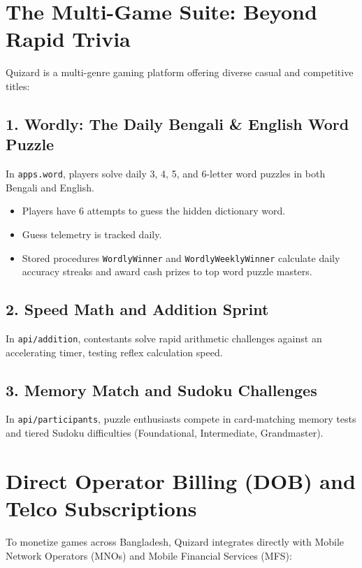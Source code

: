 \section{The Multi-Game Suite: Beyond Rapid Trivia}
Quizard is a multi-genre gaming platform offering diverse casual and competitive titles:

\subsection{1. Wordly: The Daily Bengali \& English Word Puzzle}
In \texttt{apps.word}, players solve daily 3, 4, 5, and 6-letter word puzzles in both Bengali and English. 
\begin{itemize}
    \item Players have 6 attempts to guess the hidden dictionary word.
    \item Guess telemetry is tracked daily.
    \item Stored procedures \texttt{WordlyWinner} and \texttt{WordlyWeeklyWinner} calculate daily accuracy streaks and award cash prizes to top word puzzle masters.
\end{itemize}

\subsection{2. Speed Math and Addition Sprint}
In \texttt{api/addition}, contestants solve rapid arithmetic challenges against an accelerating timer, testing reflex calculation speed.

\subsection{3. Memory Match and Sudoku Challenges}
In \texttt{api/participants}, puzzle enthusiasts compete in card-matching memory tests and tiered Sudoku difficulties (Foundational, Intermediate, Grandmaster).

\section{Direct Operator Billing (DOB) and Telco Subscriptions}
To monetize games across Bangladesh, Quizard integrates directly with Mobile Network Operators (MNOs) and Mobile Financial Services (MFS):

